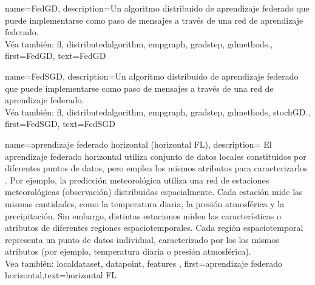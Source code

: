 
{name={FedGD},
	description={Un algoritmo distribuido de aprendizaje federado que 
		puede implementarse como paso de mensajes a través de una red de aprendizaje federado.\\ 
		Véa también: \gls{fl}, \gls{distributedalgorithm}, \gls{empgraph}, \gls{gradstep}, \gls{gdmethods}.},
	first={FedGD},
	text={FedGD}
} 

{name={FedSGD},
	description={Un algoritmo distribuido de aprendizaje federado que 
		puede implementarse como paso de mensajes a través de una red de aprendizaje federado.\\ 
		Véa también: \gls{fl}, \gls{distributedalgorithm}, \gls{empgraph}, \gls{gradstep}, \gls{gdmethods}, \gls{stochGD}.},
	first={FedSGD},
	text={FedSGD}
} 


{name={aprendizaje federado horizontal (horizontal FL)},
	description={
		El aprendizaje federado horizontal utiliza conjunto de datos locales constituidos por diferentes
		puntos de datos, pero emplea los mismos atributos para caracterizarlos \cite{HFLChapter2020}.
		Por ejemplo, la predicción meteorológica utiliza una red de estaciones meteorológicas
		(observación) distribuidas espacialmente. Cada estación mide las mismas cantidades, como
		la temperatura diaria, la presión atmosférica y la precipitación. Sin embargo,
		distintas estaciones miden las características o atributos de diferentes regiones espaciotemporales.
		Cada región espaciotemporal representa un punto de datos individual, caracterizado por los los mismos atributos
		(por ejemplo, temperatura diaria o presión atmosférica).
		\\
			Vea también: \gls{localdataset}, \gls{datapoint}, \gls{feature}s },
	first={aprendizaje federado horizontal},text={horizontal FL}
}

